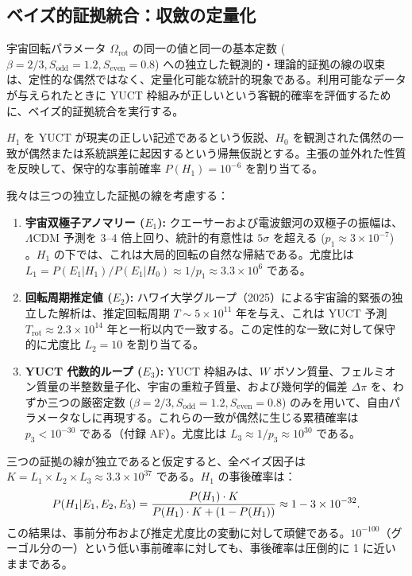 \documentclass[11pt,a4paper]{article}
\begin{document}
	\subsection{ベイズ的証拠統合：収斂の定量化}
	
	宇宙回転パラメータ \(\Omega_{\mathrm{rot}}\) の同一の値と同一の基本定数 (\(\beta=2/3, S_{\mathrm{odd}}=1.2, S_{\mathrm{even}}=0.8\)) への独立した観測的・理論的証拠の線の収束は、定性的な偶然ではなく、定量化可能な統計的現象である。利用可能なデータが与えられたときに YUCT 枠組みが正しいという客観的確率を評価するために、ベイズ的証拠統合を実行する。
	
	\(H_1\) を YUCT が現実の正しい記述であるという仮説、\(H_0\) を観測された偶然の一致が偶然または系統誤差に起因するという帰無仮説とする。主張の並外れた性質を反映して、保守的な事前確率 \(P(H_1) = 10^{-6}\) を割り当てる。
	
	我々は三つの独立した証拠の線を考慮する：
	\begin{enumerate}
		\item \textbf{宇宙双極子アノマリー (\(E_1\)):} クエーサーおよび電波銀河の双極子の振幅は、\(\Lambda\)CDM 予測を 3--4 倍上回り、統計的有意性は \(5\sigma\) を超える (\(p_1 \approx 3 \times 10^{-7}\)) \cite{Secrest2025, Singal2024}。\(H_1\) の下では、これは大局的回転の自然な帰結である。尤度比は \(L_1 = P(E_1|H_1)/P(E_1|H_0) \approx 1/p_1 \approx 3.3 \times 10^6\) である。
		
		\item \textbf{回転周期推定値 (\(E_2\)):} ハワイ大学グループ（2025）による宇宙論的緊張の独立した解析は、推定回転周期 \(T \sim 5 \times 10^{11}\) 年を与え、これは YUCT 予測 \(T_{\mathrm{rot}} \approx 2.3 \times 10^{14}\) 年と一桁以内で一致する。この定性的な一致に対して保守的に尤度比 \(L_2 = 10\) を割り当てる。
		
		\item \textbf{YUCT 代数的ループ (\(E_3\)):} YUCT 枠組みは、\(W\) ボソン質量、フェルミオン質量の半整数量子化、宇宙の重粒子質量、および幾何学的偏差 \(\Delta\pi\) を、わずか三つの厳密定数 (\(\beta=2/3, S_{\mathrm{odd}}=1.2, S_{\mathrm{even}}=0.8\)) のみを用いて、自由パラメータなしに再現する。これらの一致が偶然に生じる累積確率は \(p_3 < 10^{-30}\) である（付録 AF）。尤度比は \(L_3 \approx 1/p_3 \approx 10^{30}\) である。
	\end{enumerate}
	
	三つの証拠の線が独立であると仮定すると、全ベイズ因子は \(K = L_1 \times L_2 \times L_3 \approx 3.3 \times 10^{37}\) である。\(H_1\) の事後確率は：
	\begin{equation}
		\scriptsize
		P(H_1 | E_1, E_2, E_3) = \frac{P(H_1) \cdot K}{P(H_1) \cdot K + (1 - P(H_1))} \approx 1 - 3 \times 10^{-32}.
	\end{equation}
	この結果は、事前分布および推定尤度比の変動に対して頑健である。\(10^{-100}\)（グーゴル分の一）という低い事前確率に対しても、事後確率は圧倒的に 1 に近いままである。
	
\end{document}
